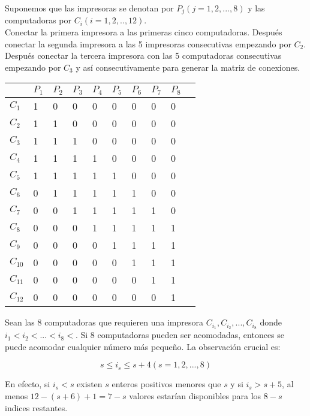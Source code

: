 \documentclass[12pt]{article}
\begin{document}
Suponemos que las impresoras se denotan por $P_{j} (j=1,2,...,8)$ y las
computadoras por $C_{i} (i=1,2,..,12)$.\\

Conectar la primera impresora a las primeras cinco computadoras. Despu\'es
conectar la segunda impresora a las 5 impresoras consecutivas empezando por
$C_{2}$. Despu\'es conectar la tercera impresora con las 5 computadoras
consecutivas empezando por $C_{3}$ y as\'i consecutivamente para generar la
matriz de conexiones.

\begin{table}[h!]
	\begin{tabular}{l|lllllllll}
		       &$P_{1}$&$P_{2}$&$P_{3}$ &$P_{4}$&$P_{5}$&$P_{6}$&$P_{7}$&$P_{8}$&\\\hline
		$C_{1}$&  1&  0&  0&   0& 	 0&   0&   0&  0&\\ 
		$C_{2}$&  1&  1&  0&   0& 	 0&   0&   0&  0&\\
		$C_{3}$&  1&  1&  1&   0& 	 0&   0&   0&  0&\\
		$C_{4}$&  1&  1&  1&   1& 	 0&   0&   0&  0&\\
		$C_{5}$&  1&  1&  1&   1& 	 1&   0&   0&  0&\\
		$C_{6}$&  0&  1&  1&   1& 	 1&   1&   0&  0&\\
		$C_{7}$&  0&  0&  1&   1& 	 1&   1&   1&  0&\\
		$C_{8}$&  0&  0&  0&   1& 	 1&   1&   1&  1&\\
		$C_{9}$&  0&  0&  0&   0& 	 1&   1&   1&  1&\\
		$C_{10}$&  0&  0&  0&   0& 	 0&   1&   1&  1&\\
		$C_{11}$&  0&  0&  0&   0& 	 0&   0&   1&  1&\\
		$C_{12}$&  0&  0&  0&   0& 	 0&   0&   0&  1&\\
	\end{tabular}
\end{table}

Sean las 8 computadoras que requieren una impresora $C_{i_{1}}, C_{i_{2}},...,
C_{i_{8}}$ donde $i_{1} <i_{2}<...<i_{8} < $. Si 8 computadoras pueden ser
acomodadas, entonces se puede acomodar cualquier n\'umero m\'as peque\~no. La
observaci\'on crucial es:

\begin{equation}
	s \leq i_{s} \leq s+4   (s=1,2,...,8)
\end{equation}

En efecto, si $i_{s} < s$ existen $s$ enteros positivos menores que $s$ y si
$i_{s} > s+5$, al menos $12-(s+6)+1=7-s$ valores estar\'ian disponibles para los
$8-s$ indices restantes.\\
\end{document}
